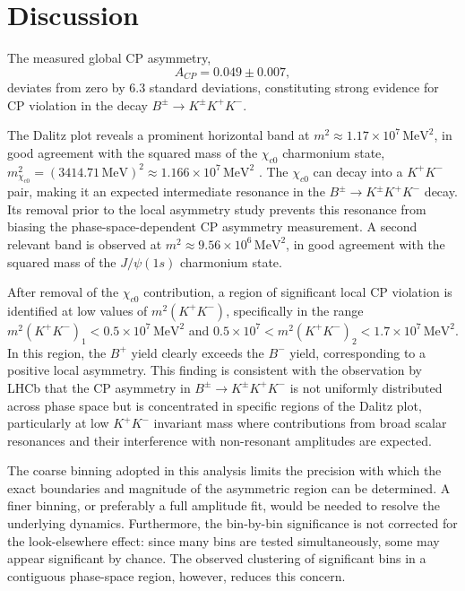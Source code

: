 \section{Discussion}
\label{sec:Discussion}
The measured global CP asymmetry,
\begin{equation*}
    A_{CP} = 0.049 \pm 0.007,
\end{equation*}
deviates from zero by $6.3$ standard deviations, 
constituting strong evidence for CP violation in the decay $B^{\pm} \to K^{\pm}K^{+}K^{-}$.

The Dalitz plot reveals a prominent horizontal band at $m^2 \approx 1.17 \times 10^7\,\text{MeV}^2$,
in good agreement with the squared mass of the $\chi_{c0}$ charmonium state,
$m^2_{\chi_{c0}} = (3414.71\,\text{MeV})^2 \approx 1.166 \times 10^7\,\text{MeV}^2$ \cite{PDG2024}.
The $\chi_{c0}$ can decay into a $K^+K^-$ pair, making it an expected intermediate resonance in the $B^{\pm} \to K^{\pm}K^+K^-$ decay.
Its removal prior to the local asymmetry study prevents this resonance from biasing the phase-space-dependent CP asymmetry measurement.
A second relevant band is observed at $m^2 \approx 9.56 \times 10^6\,\text{MeV}^2$,
in good agreement with the squared mass of the $J/\psi(1s)$ charmonium state\cite{PDG2024}.

After removal of the $\chi_{c0}$ contribution, a region of significant local CP violation is identified at low values of $m^2(K^+K^-)$,
specifically in the range $m^2(K^+K^-)_1 < 0.5 \times 10^7\,\text{MeV}^2$ and $0.5 \times 10^7 < m^2(K^+K^-)_2 < 1.7 \times 10^7\,\text{MeV}^2$.
In this region, the $B^+$ yield clearly exceeds the $B^-$ yield,
corresponding to a positive local asymmetry.
This finding is consistent with the observation by LHCb that the CP asymmetry in $B^{\pm} \to K^{\pm}K^+K^-$ is not uniformly distributed across phase space but is concentrated in specific regions of the Dalitz plot,
particularly at low $K^+K^-$ invariant mass where contributions from broad scalar resonances and their interference with non-resonant amplitudes are expected.

The coarse binning adopted in this analysis limits the precision with which the exact boundaries and magnitude of the asymmetric region can be determined.
A finer binning, or preferably a full amplitude fit, would be needed to resolve the underlying dynamics.
Furthermore, the bin-by-bin significance is not corrected for the look-elsewhere effect:
since many bins are tested simultaneously, some may appear significant by chance.
The observed clustering of significant bins in a contiguous phase-space region, however, reduces this concern.

